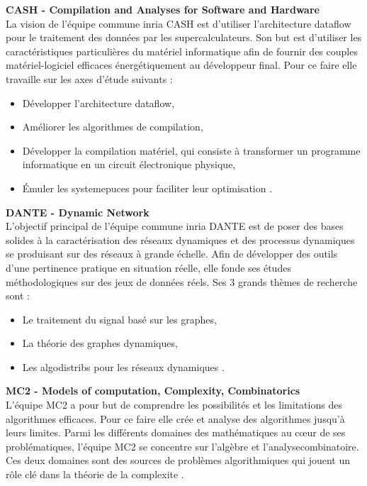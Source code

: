 \textbf{CASH - Compilation and Analyses for Software and Hardware}\\
La vision de l'équipe commune \gls{inria} CASH est d'utiliser l'architecture \gls{dataflow} pour le traitement des données par les supercalculateurs. Son but est d'utiliser les caractéristiques particulières du matériel informatique afin de fournir des couples matériel-logiciel efficaces énergétiquement au développeur final. Pour ce faire elle travaille sur les axes d'étude suivants :
\begin{itemize}
	\item Développer l'architecture \gls{dataflow},
	\item Améliorer les algorithmes de compilation,
	\item Développer la compilation matériel, qui consiste à transformer un programme informatique en un circuit électronique physique,
	\item Émuler les \glspl{systemepuce} pour faciliter leur optimisation \cite{cash}.\\
\end{itemize}

\textbf{DANTE - Dynamic Network}\\
L'objectif principal de l'équipe commune \gls{inria} DANTE est de poser des bases solides à la caractérisation des réseaux dynamiques et des processus dynamiques se produisant sur des réseaux à grande échelle. Afin de développer des outils d'une pertinence pratique en situation réelle, elle fonde ses études méthodologiques sur des jeux de données réels. Ses 3 grands thèmes de recherche sont :
\begin{itemize}
	\item Le traitement du signal basé sur les graphes,
	\item La théorie des graphes dynamiques,
	\item Les \glspl{algodistrib} pour les réseaux dynamiques \cite{dante}.
\end{itemize}
\newpage
\textbf{MC2 - Models of computation, Complexity, Combinatorics}\\
L'équipe MC2 a pour but de comprendre les possibilités et les limitations des algorithmes efficaces. Pour ce faire elle crée et analyse des algorithmes jusqu'à leurs limites. Parmi les différents domaines des mathématiques au cœur de ses problématiques, l'équipe MC2 se concentre sur l'algèbre et l'\gls{analysecombinatoire}. Ces deux domaines sont des sources de problèmes algorithmiques qui jouent un rôle clé dans la théorie de la \gls{complexite} \cite{mc2}.\\

